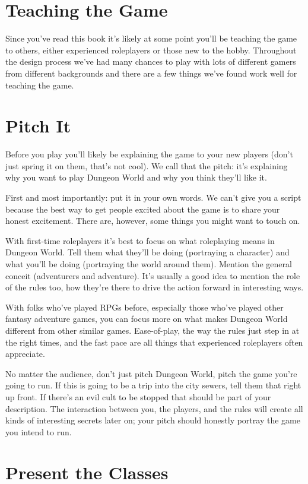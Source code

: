 \section{Teaching the Game}


 Since you've read this book it's likely at some point you'll be teaching the game to others, either experienced roleplayers or those new to the hobby. Throughout the design process we've had many chances to play with lots of different gamers from different backgrounds and there are a few things we've found work well for teaching the game.
\section{Pitch It}


 Before you play you'll likely be explaining the game to your new players (don't just spring it on them, that's not cool). We call that the pitch: it's explaining why you want to play Dungeon World and why you think they'll like it.


 First and most importantly: put it in your own words. We can't give you a script because the best way to get people excited about the game is to share your honest excitement. There are, however, some things you might want to touch on.


 With first-time roleplayers it's best to focus on what roleplaying means in Dungeon World. Tell them what they'll be doing (portraying a character) and what you'll be doing (portraying the world around them). Mention the general conceit (adventurers and adventure). It's usually a good idea to mention the role of the rules too, how they're there to drive the action forward in interesting ways.


 With folks who've played RPGs before, especially those who've played other fantasy adventure games, you can focus more on what makes Dungeon World different from other similar games. Ease-of-play, the way the rules just step in at the right times, and the fast pace are all things that experienced roleplayers often appreciate.


 No matter the audience, don't just pitch Dungeon World, pitch the game you're going to run. If this is going to be a trip into the city sewers, tell them that right up front. If there's an evil cult to be stopped that should be part of your description. The interaction between you, the players, and the rules will create all kinds of interesting secrets later on; your pitch should honestly portray the game you intend to run.
\section{Present the Classes}



